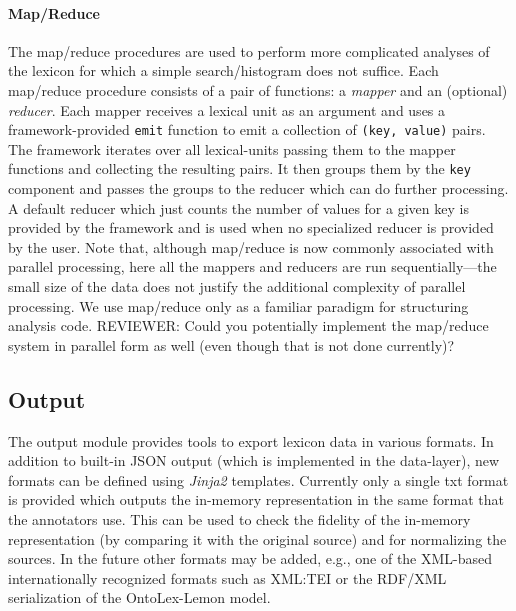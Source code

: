 \documentclass[10pt, a4paper]{article}
\newcommand{\py}[1]{{\tt #1}}
\newcommand{\rrr}[1]{{\color{red} REVIEWER: #1}}
\begin{document}
\paragraph{Map/Reduce} The map/reduce procedures are used to perform more complicated analyses of the lexicon
for which a simple search/histogram does not suffice. Each map/reduce procedure consists of a pair of functions:
a \emph{mapper} and an (optional) \emph{reducer}. Each mapper receives a lexical unit as an argument and
uses a framework-provided \py{emit} function to emit a collection of \py{(key, value)} pairs. The framework
iterates over all lexical-units passing them to the mapper functions and collecting the resulting pairs. It then groups them by the \py{key} component and passes the groups to the reducer which can do further processing.
A default reducer which just counts the number of values for a given key is provided by the framework and is
used when no specialized reducer is provided by the user. Note that, although map/reduce is now commonly associated with
parallel processing, here all the mappers and reducers are run sequentially---the small size of the data does not justify
the additional complexity of parallel processing. We use map/reduce only as a familiar paradigm for structuring
analysis code.
\rrr{Could you potentially implement the map/reduce system in parallel form as well (even though that is not done currently)?}

\subsection{Output}\label{sec:output}

The output module provides tools to export lexicon data in various formats. In addition to built-in JSON
output (which is implemented in the data-layer), new formats can be defined using \emph{Jinja2} \cite{tool:Jinja2} templates.
Currently only a single txt format is provided which outputs the in-memory representation in the same
format that the annotators use. This can be used to check the fidelity of the in-memory representation
(by comparing it with the original source) and for normalizing the sources. In the future other formats
may be added, e.g., 
one of the XML-based internationally recognized formats such as XML:TEI or the RDF/XML serialization of the OntoLex-Lemon model.

\end{document}
